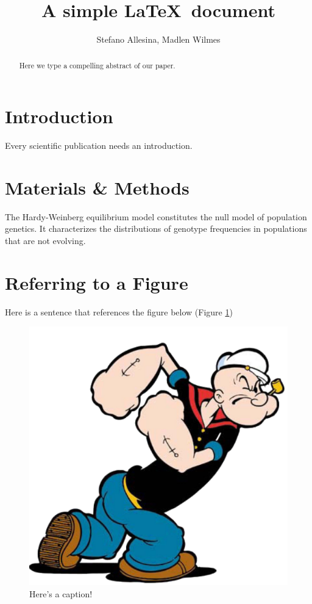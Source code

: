 \documentclass[12pt]{article}
\title{A simple \LaTeX\ document}
\author{Stefano Allesina, Madlen Wilmes}
\date{}
\begin{document}
\maketitle
\begin{abstract}
Here we type a compelling abstract of our paper.
\end{abstract}
\section{Introduction}
Every scientific publication needs an introduction.
\section{Materials \& Methods}
The Hardy-Weinberg equilibrium model constitutes the null model of population genetics. It characterizes the distributions of genotype  frequencies in populations that are not evolving.
\section{Referring to a Figure}
Here is a sentence that references the figure below (Figure \ref{fig:pop})

\begin{figure}
\label{fig:pop}
\begin{center}
 \includegraphics[width=0.5\linewidth]{figures/popeye.png}
\end{center}
\caption{Here's a caption!}
\end{figure}
\end{document}
